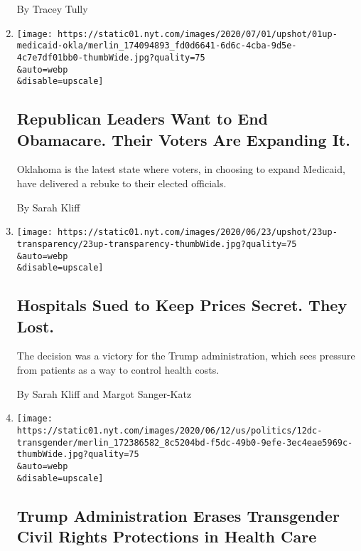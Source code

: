 \begin{enumerate}
  By Tracey Tully
\item
  \href{/2020/07/01/upshot/oklahoma-obamacare-Republican-voters-expand.html}{}

  \texttt{[image: https://static01.nyt.com/images/2020/07/01/upshot/01up-medicaid-okla/merlin\_174094893\_fd0d6641-6d6c-4cba-9d5e-4c7e7df01bb0-thumbWide.jpg?quality=75\\\&auto=webp\\\&disable=upscale]}

  \hypertarget{republican-leaders-want-to-end-obamacare-their-voters-are-expanding-it}{%
  \subsection{Republican Leaders Want to End Obamacare. Their Voters Are
  Expanding
  It.}\label{republican-leaders-want-to-end-obamacare-their-voters-are-expanding-it}}

  Oklahoma is the latest state where voters, in choosing to expand
  Medicaid, have delivered a rebuke to their elected officials.

  By Sarah Kliff
\item
  \href{/2020/06/23/upshot/hospitals-lost-price-transparency-lawsuit.html}{}

  \texttt{[image: https://static01.nyt.com/images/2020/06/23/upshot/23up-transparency/23up-transparency-thumbWide.jpg?quality=75\\\&auto=webp\\\&disable=upscale]}

  \hypertarget{hospitals-sued-to-keep-prices-secret-they-lost}{%
  \subsection{Hospitals Sued to Keep Prices Secret. They
  Lost.}\label{hospitals-sued-to-keep-prices-secret-they-lost}}

  The decision was a victory for the Trump administration, which sees
  pressure from patients as a way to control health costs.

  By Sarah Kliff and Margot Sanger-Katz
\item
  \href{/2020/06/12/us/politics/trump-transgender-rights.html}{}

  \texttt{[image: https://static01.nyt.com/images/2020/06/12/us/politics/12dc-transgender/merlin\_172386582\_8c5204bd-f5dc-49b0-9efe-3ec4eae5969c-thumbWide.jpg?quality=75\\\&auto=webp\\\&disable=upscale]}

  \hypertarget{trump-administration-erases-transgender-civil-rights-protections-in-health-care}{%
  \subsection{Trump Administration Erases Transgender Civil Rights
  Protections in Health
  Care}\label{trump-administration-erases-transgender-civil-rights-protections-in-health-care}}


\end{enumerate}
